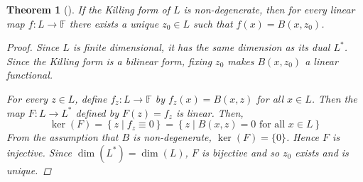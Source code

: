 \documentclass[letterpaper, 10pt]{article}
\theoremstyle{theostyle}
\newtheorem{theorem}{Theorem}[section]
\newenvironment{thmstyle}[1][]{%
    \begin{theorem}[#1]\leavevmode\vspace{-\baselineskip}\myquote%
    }{\endmyquote\end{theorem}}
\begin{document}
\begin{thmstyle}
    If the Killing form of \(L\) is non-degenerate, then for every linear map \(f: L \rightarrow \mathbb{F}\) there exists a unique \(z_0 \in L\) such that \(f(x) = B(x,z_0)\).

    \begin{proof}
        Since \(L\) is finite dimensional, it has the same dimension as its dual \(L^\ast\).
        Since the Killing form is a bilinear form, fixing \(z_0\) makes \(B(x,z_0)\) a linear functional.
        
        For every \(z \in L\), define \(f_z : L \rightarrow \mathbb{F}\) by \(f_z(x) = B(x,z)\) for all \(x \in L\).
        Then the map \(F:L \rightarrow L^\ast\) defined by \(F(z) = f_z\) is linear.
        Then,
        \[\ker{(F)} = \left\{z \mid f_z \equiv 0\right\} = \left\{z \mid B(x,z) = 0 \text{ for all } x \in L \right\}\]
        From the assumption that \(B\) is non-degenerate, \(\ker{(F)} = \{0\}\).
        Hence \(F\) is injective.
        Since \(\dim{(L^\ast)} = \dim{(L)}\), \(F\) is bijective and so \(z_0\) exists and is unique.
    \end{proof}
\end{thmstyle}
\end{document}

